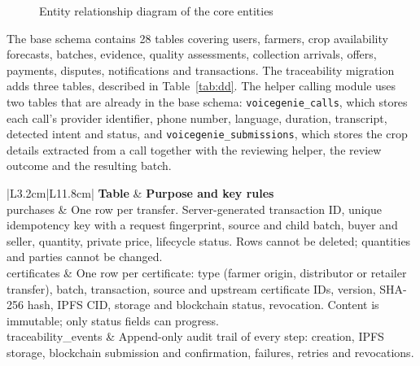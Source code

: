\begin{figure}[!ht]
\caption{Entity relationship diagram of the core entities}
\label{fig:er}
\end{figure}

The base schema contains 28 tables covering users, farmers, crop availability forecasts, batches, evidence, quality assessments, collection arrivals, offers, payments, disputes, notifications and transactions. The traceability migration adds three tables, described in Table~\ref{tab:dd}. The helper calling module uses two tables that are already in the base schema: \texttt{voicegenie\_\allowbreak{}calls}, which stores each call's provider identifier, phone number, language, duration, transcript, detected intent and status, and \texttt{voicegenie\_\allowbreak{}submissions}, which stores the crop details extracted from a call together with the reviewing helper, the review outcome and the resulting batch.

\begin{table}[!ht]
	\caption{Data dictionary of the traceability tables}
	\label{tab:dd}
	\centering
	\small
	\begin{tabular}{|L{3.2cm}|L{11.8cm}|}
		\hline
		\textbf{Table} & \textbf{Purpose and key rules} \\ \hline
		purchases & One row per transfer. Server-generated transaction ID, unique idempotency key with a request fingerprint, source and child batch, buyer and seller, quantity, private price, lifecycle status. Rows cannot be deleted; quantities and parties cannot be changed. \\ \hline
		certificates & One row per certificate: type (farmer origin, distributor or retailer transfer), batch, transaction, source and upstream certificate IDs, version, SHA-256 hash, IPFS CID, storage and blockchain status, revocation. Content is immutable; only status fields can progress. \\ \hline
		traceability\_events & Append-only audit trail of every step: creation, IPFS storage, blockchain submission and confirmation, failures, retries and revocations. \\ \hline
	\end{tabular}
\end{table}

